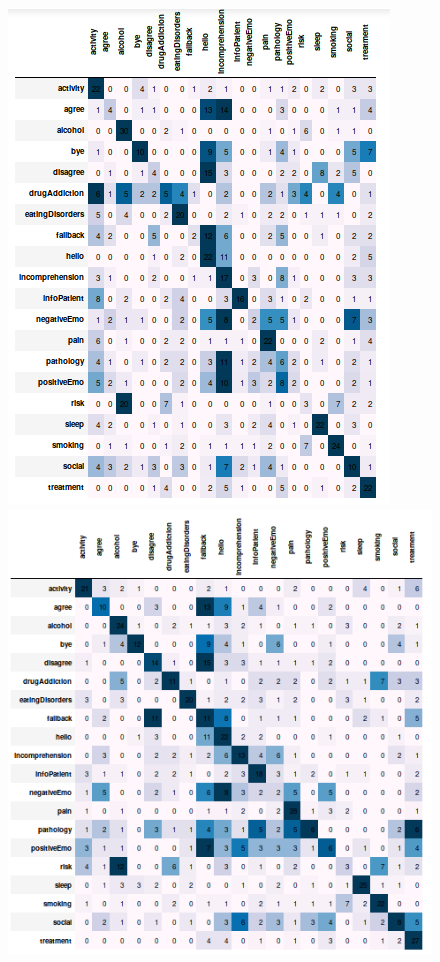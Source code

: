 \documentclass[11pt]{article}
\begin{document}
{\begin{figure}[h]
	\centering
	\includegraphics[scale=0.25]{svc0_cm.png}
	\includegraphics[scale=0.25]{svc1_cm.png}

\end{figure}}
\end{document}
